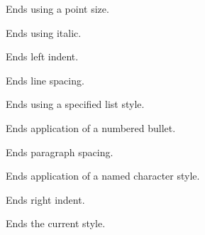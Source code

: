 
Ends using a point size.

\label{wxrichtextctrlenditalic}


Ends using italic.

\label{wxrichtextctrlendleftindent}


Ends left indent.

\label{wxrichtextctrlendlinespacing}


Ends line spacing.

\label{wxrichtextctrlendliststyle}


Ends using a specified list style.

\label{wxrichtextctrlendnumberedbullet}


Ends application of a numbered bullet.

\label{wxrichtextctrlendparagraphspacing}


Ends paragraph spacing.

\label{wxrichtextctrlendparagraphstyle}


Ends application of a named character style.

\label{wxrichtextctrlendrightindent}


Ends right indent.

\label{wxrichtextctrlendstyle}


Ends the current style.

\label{wxrichtextctrlendsuppressundo}

